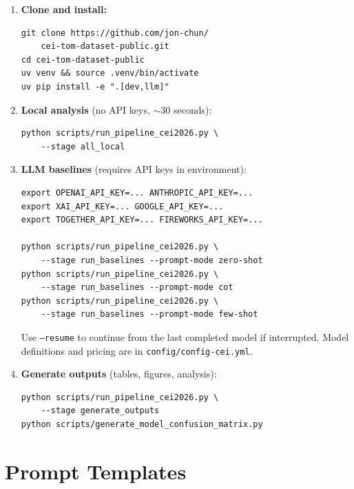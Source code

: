 \documentclass[twoside,11pt]{article}
\begin{document}
\begin{enumerate}[leftmargin=*,noitemsep]
    \item \textbf{Clone and install:}
\begin{small}
\begin{verbatim}
git clone https://github.com/jon-chun/
    cei-tom-dataset-public.git
cd cei-tom-dataset-public
uv venv && source .venv/bin/activate
uv pip install -e ".[dev,llm]"
\end{verbatim}
\end{small}
    \item \textbf{Local analysis} (no API keys, $\sim$30 seconds):
\begin{small}
\begin{verbatim}
python scripts/run_pipeline_cei2026.py \
    --stage all_local
\end{verbatim}
\end{small}
    \item \textbf{LLM baselines} (requires API keys in environment):
\begin{small}
\begin{verbatim}
export OPENAI_API_KEY=... ANTHROPIC_API_KEY=...
export XAI_API_KEY=... GOOGLE_API_KEY=...
export TOGETHER_API_KEY=... FIREWORKS_API_KEY=...

python scripts/run_pipeline_cei2026.py \
    --stage run_baselines --prompt-mode zero-shot
python scripts/run_pipeline_cei2026.py \
    --stage run_baselines --prompt-mode cot
python scripts/run_pipeline_cei2026.py \
    --stage run_baselines --prompt-mode few-shot
\end{verbatim}
\end{small}
    Use \texttt{--resume} to continue from the last completed model if interrupted. Model definitions and pricing are in \texttt{config/config-cei.yml}.
    \item \textbf{Generate outputs} (tables, figures, analysis):
\begin{small}
\begin{verbatim}
python scripts/run_pipeline_cei2026.py \
    --stage generate_outputs
python scripts/generate_model_confusion_matrix.py
\end{verbatim}
\end{small}
\end{enumerate}

\section{Prompt Templates}
\label{app:prompts}
\end{document}
